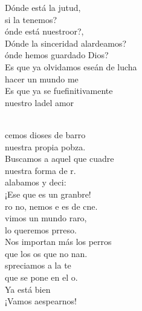 \documentclass[12pt]{article}
\begin{document}
\begin{multicols*}{2}
\begin{cancion}%
	\begin{chorus}%
	Dónde está la jutud,\\
si la tenemos?\\
	ónde está nuestroor?,\\
	Dónde la sinceridad  alardeamos?\\
	ónde hemos guardado Dios?\\
	Es que ya olvidamos eseán de lucha\\
	 hacer un mundo me\\
	Es que ya se fuefinitivamente\\
	nuestro ladel amor\\
	\end{chorus}%
	\jump\\
	cemos dioses de barro\\
	 nuestra propia pobza.\\
Buscamos a aquel que cuadre\\
	 nuestra forma de r.\\
	 alabamos y deci:\\
	¡Ese que es un granbre! \\
	ro no, nemos e es de cne.\\
\jump
	vimos un mundo raro,\\
	lo queremos prreso.\\
Nos importan más los perros\\
	que los os que no nan. \\
	spreciamos a la te\\
	que se pone en el o.\\
	Ya está bien\\
	¡Vamos aespearnos!\\
\end{cancion}%


\end{multicols*}
\end{document}
